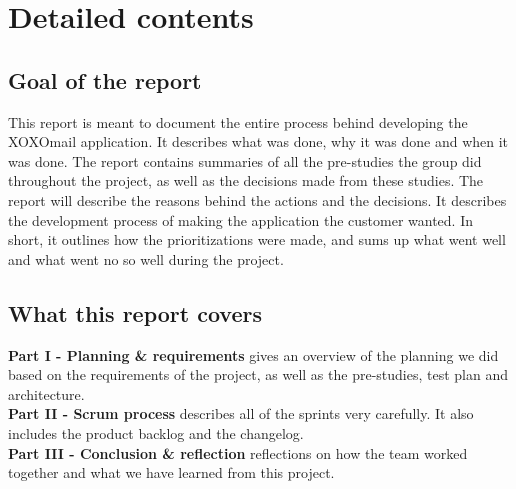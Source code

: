 \chapter*{Detailed contents}

\section*{Goal of the report}
This report is meant to document the entire process behind developing the XOXOmail application. It describes what was done, why it was done and when it was done. The report contains summaries of all the pre-studies the group did throughout the project, as well as the decisions made from these studies. The report will describe the reasons behind the actions and the decisions. It describes the development process of making the application the customer wanted. In short, it outlines how the prioritizations were made, and sums up what went well and what went no so well during the project. 

\section*{What this report covers}
\textbf{Part I - Planning \& requirements} gives an overview of the planning we did based on the  \hspace*{4.3em} requirements of the project, as well as the pre-studies, test plan and architecture. \\
\textbf{Part II - Scrum process} describes all of the sprints very carefully. It also includes the product  \hspace*{4.3em} backlog and the changelog.\\
\textbf{Part III - Conclusion \& reflection} reflections on how the team worked together and what we  \hspace*{4.3em} have learned from this project.\\

